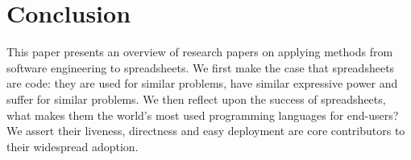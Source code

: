 \documentclass[conference]{IEEEtran}
\begin{document}
\section{Conclusion}
This paper presents an overview of research papers on applying methods from software engineering to spreadsheets. We first make the case that spreadsheets are code: they are used for similar problems, have similar expressive power and suffer for similar problems. We then reflect upon the success of spreadsheets, what makes them the world's most used programming languages for end-users? We assert their liveness, directness and easy deployment are core contributors to their widespread adoption. 


\balance









\end{document}

